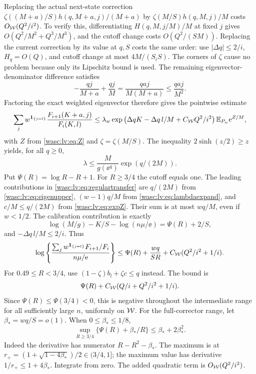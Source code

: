 \documentclass[11pt,a4paper]{article}
\theoremstyle{remark}\newtheorem{remark}[theorem]{Remark}
\newcommand{\ind}{\mathbf 1}\newcommand{\wasc}{\operatorname{wasc}}\newcommand{\dasc}{\operatorname{dasc}}
\numberwithin{equation}{section}
\begin{document}
Replacing the actual next-state correction
$\zeta((M+a)/S)h(q,M+a,j)/(M+a)$ by
$\zeta(M/S)h(q,M,j)/M$ costs $O_{\mathcal W}(Q^2/i^2)$.
To verify this, differentiating $H(q,M,j/M)/M$ at fixed $j$ gives
$O(Q^2/M^2+Q^3/M^3)$, and the cutoff change costs $O(Q^2/(SM))$.
Replacing the current correction by its value at $q,S$ costs the same order: use
$|\Delta q|\le2/i$, $H_q=O(Q)$, and cutoff change at most $4M/(S_iS)$.
The corners of $\zeta$ cause no problem because only its Lipschitz bound is used.
The remaining eigenvector-denominator difference satisfies
\begin{equation}\label{wasc:lv:eq:denomdiscrep}
-\frac{qj}{M+a}+\frac{qj}{M}
=\frac{qaj}{M(M+a)}\le\frac{qaj}{M^2}.
\end{equation}
Factoring the exact weighted eigenvector therefore gives the pointwise estimate
\begin{equation}\label{wasc:lv:eq:regulartransfer}
\sum_j w^{\ind_{\{j=l\}}}\frac{F_{i+1}(K+a,j)}{F_i(K,l)}
\le\lambda_w\exp\left(\Delta qK-\Delta q\,l/M+C_{\Wc}Q^2/i^2\right)
\E_{P_w}\ee^{Z/M},
\end{equation}
with $Z$ from \eqref{wasc:lv:eq:Z} and $\zeta=\zeta(M/S)$.
The inequality $2\sinh(z/2)\ge z$ yields, for all $q\ge0$,
\begin{equation}\label{wasc:lv:eq:eigenupper}
\lambda\le\frac M{g(\ee^q)}\exp(q/(2M)).
\end{equation}
Put $\Psi(R)=\log R-R+1$. For $R\ge3/4$ the cutoff equals one.
The leading contributions in \eqref{wasc:lv:eq:regulartransfer} are $q/(2M)$ from
\eqref{wasc:lv:eq:eigenupper}, $(w-1)q/M$ from \eqref{wasc:lv:eq:lambdaexpand}, and $c/M\le q/(2M)$ from \eqref{wasc:lv:eq:expZ}. Their sum is at most $wq/M$, even if $w<1/2$.
The calibration contribution is exactly
\[
\log(M/g)-K/S-\log(n\mu/\ee)=\Psi(R)+2/S,
\]
and $-\Delta q\,l/M\le2/i$. Thus
\begin{equation}\label{wasc:lv:eq:regularbound}
\log\left\{\frac{\sum_j w^{\ind_{\{j=l\}}}F_{i+1}/F_i}{n\mu/\ee}\right\}
\le\Psi(R)+\frac{wq}{SR}+C_{\Wc}(Q^2/i^2+1/i).
\end{equation}
For $0.49\le R<3/4$, use $(1-\zeta)b_l+\zeta c\le q$ instead. The bound is
\begin{equation}\label{wasc:lv:eq:intermediate}
\Psi(R)+C_{\mathcal W}(Q/i+Q^2/i^2+1/i).
\end{equation}
Since $\Psi(R)\le\Psi(3/4)<0$, this is negative throughout the intermediate range for all sufficiently large $n$, uniformly on $\mathcal W$.
For the full-corrector range, let $\beta_*=wq/S=o(1)$. When $0\le\beta_*\le1/8$,
\begin{equation}\label{wasc:lv:eq:psiopt}
\sup_{R\ge3/4}\{\Psi(R)+\beta_*/R\}\le\beta_*+2\beta_*^2.
\end{equation}
Indeed the derivative has numerator $R-R^2-\beta_*$. The maximum is at
$r_+=(1+\sqrt{1-4\beta_*})/2\in(3/4,1]$; the maximum value has derivative
$1/r_+\le1+4\beta_*$. Integrate from zero. The added quadratic term is $O_{\mathcal W}(Q^2/i^2)$.
\end{document}
